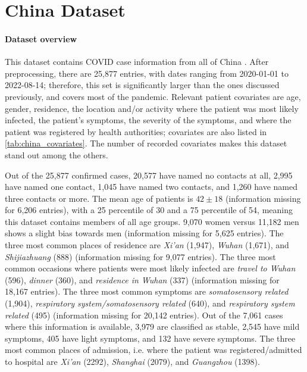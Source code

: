 \section{China Dataset}
\label{sec:china_data}

\paragraph{Dataset overview} This dataset contains COVID case information from all of China \cite{china_publication,china_data}. After preprocessing, there are 25,877 entries, with dates ranging from 2020-01-01 to 2022-08-14; therefore, this set is significantly larger than the ones discussed previously, and covers most of the pandemic. Relevant patient covariates are age, gender, residence, the location and/or activity where the patient was most likely infected, the patient's symptoms, the severity of the symptoms, and where the patient was registered by health authorities; covariates are also listed in \ref{tab:china_covariates}. The number of recorded covariates makes this dataset stand out among the others.

Out of the 25,877 confirmed cases, 20,577 have named no contacts at all, 2,995 have named one contact, 1,045 have named two contacts, and 1,260 have named three contacts or more. The mean age of patients is $42\pm18$ (information missing for 6,206 entries), with a 25 percentile of 30 and a 75 percentile of 54, meaning this dataset contains members of all age groups. 9,070 women versus 11,182 men shows a slight bias towards men (information missing for 5,625 entries). The three most common places of residence are \emph{Xi'an} (1,947), \emph{Wuhan} (1,671), and \emph{Shijiazhuang} (888) (information missing for 9,077 entries). The three most common occasions where patients were most likely infected are \emph{travel to Wuhan} (596), \emph{dinner} (360), and \emph{residence in Wuhan} (337) (information missing for 18,167 entries). The three most common symptoms are \emph{somatosensory related} (1,904), \emph{respiratory system/somatosensory related} (640), and \emph{respiratory system related} (495) (information missing for 20,142 entries). Out of the 7,061 cases where this information is available, 3,979 are classified as stable, 2,545 have mild symptoms, 405 have light symptoms, and 132 have severe symptoms. The three most common places of admission, i.e. where the patient was registered/admitted to hospital are \emph{Xi'an} (2292), \emph{Shanghai} (2079), and \emph{Guangzhou} (1398).

